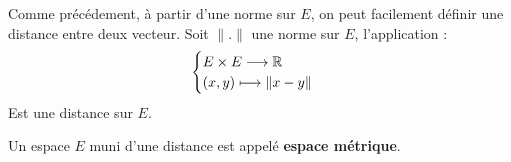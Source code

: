 \begin{proposition}
    Comme précédement, à partir d'une norme sur $E$, on peut facilement définir une distance entre deux vecteur. 
    Soit $\|.\|$ une norme sur $E$, l'application :
        \[ 
            \begin{cases}
                E \times E \longrightarrow \mathbb{R} \\ 
                (x,y) \longmapsto \| x - y \| 
            \end{cases}
        \] 
    Est une distance sur $E$. 
\end{proposition}

\begin{remark}[Vocabulaire]
    Un espace $E$ muni d'une distance est appelé \textbf{espace métrique}. 
\end{remark}


